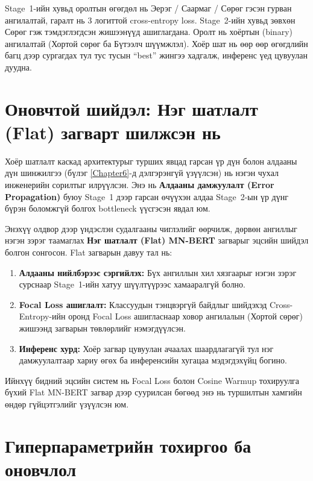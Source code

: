 Stage~1-ийн хувьд оролтын өгөгдөл нь Эерэг / Саармаг / Сөрөг гэсэн гурван
ангилалтай, гаралт нь 3 логиттой cross-entropy loss. Stage~2-ийн хувьд зөвхөн
Сөрөг гэж тэмдэглэгдсэн жишээнүүд ашиглагдана. Оролт нь хоёртын (binary)
ангилалтай (Хортой сөрөг ба Бүтээлч шүүмжлэл). Хоёр шат нь өөр өөр өгөгдлийн багц дээр
сургагдах тул тус тусын ``best'' жингээ хадгалж, инференс үед цувуулан дуудна.

\section{Оновчтой шийдэл: Нэг шатлалт (Flat) загварт шилжсэн нь}

Хоёр шатлалт каскад архитектурыг турших явцад гарсан үр дүн болон алдааны
дүн шинжилгээ (бүлэг \ref{Chapter6}-д дэлгэрэнгүй үзүүлсэн) нь нэгэн чухал
инженерийн сорилтыг илрүүлсэн. Энэ нь \textbf{Алдааны дамжуулалт (Error
Propagation)} буюу Stage~1 дээр гарсан өчүүхэн алдаа Stage~2-ын үр дүнг
бүрэн боломжгүй болгох bottleneck үүсгэсэн явдал юм.

Энэхүү олдвор дээр үндэслэн судалгааны чиглэлийг өөрчилж, дөрвөн
ангиллыг нэгэн зэрэг таамаглах \textbf{Нэг шатлалт (Flat) MN-BERT} загварыг
эцсийн шийдэл болгон сонгосон. Flat загварын давуу тал нь:

\begin{enumerate}
    \item \textbf{Алдааны нийлбэрээс сэргийлэх:} Бүх ангиллын хил хязгаарыг
    нэгэн зэрэг сурснаар Stage~1-ийн хатуу шүүлтүүрээс хамааралгүй болно.
    \item \textbf{Focal Loss ашиглалт:} Классуудын тэнцвэргүй байдлыг шийдэхэд
    Cross-Entropy-ийн оронд Focal Loss ашигласнаар ховор ангилалын (Хортой сөрөг)
    жишээнд загварын төвлөрлийг нэмэгдүүлсэн.
    \item \textbf{Инференс хурд:} Хоёр загвар цувуулан ачаалах шаардлагагүй тул
    нэг дамжуулалтаар хариу өгөх ба инференсийн хугацаа мэдэгдэхүйц богино.
\end{enumerate}

Ийнхүү бидний эцсийн систем нь Focal Loss болон Cosine Warmup тохируулга бүхий
Flat MN-BERT загвар дээр суурилсан бөгөөд энэ нь туршилтын хамгийн өндөр
гүйцэтгэлийг үзүүлсэн юм.

\section{Гиперпараметрийн тохиргоо ба оновчлол}

